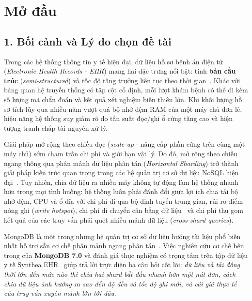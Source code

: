 \chapter*{Mở đầu}

\section*{1. Bối cảnh và Lý do chọn đề tài}

Trong các hệ thống thông tin y tế hiện đại, dữ liệu hồ sơ bệnh án điện tử (\textit{Electronic Health Records - EHR}) mang hai đặc trưng nổi bật: tính \textbf{bán cấu trúc} (\textit{semi-structured}) và tốc độ tăng trưởng liên tục theo thời gian~\cite{Freire2016}. Khác với bảng quan hệ truyền thống có tập cột cố định, mỗi lượt khám bệnh có thể đi kèm số lượng mã chẩn đoán và kết quả xét nghiệm biến thiên lớn. Khi khối lượng hồ sơ tích lũy qua nhiều năm vượt quá bộ nhớ đệm RAM của một máy chủ đơn lẻ, hiệu năng hệ thống suy giảm rõ do tần suất đọc/ghi ổ cứng tăng cao và hiện tượng tranh chấp tài nguyên xử lý.

Giải pháp mở rộng theo chiều dọc (\textit{scale-up} - nâng cấp phần cứng trên cùng một máy chủ) sớm chạm trần chi phí và giới hạn vật lý. Do đó, mở rộng theo chiều ngang thông qua phân mảnh dữ liệu phân tán (\textit{Horizontal Sharding}) trở thành giải pháp kiến trúc quan trọng trong các hệ quản trị cơ sở dữ liệu NoSQL hiện đại~\cite{Cattell2011,Kleppmann2017}. Tuy nhiên, chia dữ liệu ra nhiều máy không tự động làm hệ thống nhanh hơn trong mọi tình huống: hệ thống luôn phải đánh đổi giữa lợi ích chia tải bộ nhớ đệm, CPU và ổ đĩa với chi phí đi qua bộ định tuyến trung gian, rủi ro điểm nóng ghi (\textit{write hotspot}), chi phí di chuyển cân bằng dữ liệu~\cite{Liu2012} và chi phí thu gom kết quả của các truy vấn phải quét nhiều mảnh dữ liệu (\textit{cross-shard queries}).

MongoDB là một trong những hệ quản trị cơ sở dữ liệu hướng tài liệu phổ biến nhất hỗ trợ sẵn cơ chế phân mảnh ngang phân tán~\cite{MongoDBSharding}. Việc nghiên cứu cơ chế bên trong của \textbf{MongoDB 7.0} và đánh giá thực nghiệm có trọng tâm trên tập dữ liệu y tế Synthea EHR~\cite{Walonoski2018} giúp trả lời trực diện ba câu hỏi cốt lõi: \textit{dữ liệu và tải đồng thời lớn đến mức nào thì chia hai shard bắt đầu nhanh hơn một nút đơn, cách chia dữ liệu ảnh hưởng ra sao đến độ đều và tốc độ ghi mới, và cái giá thực tế của truy vấn xuyên mảnh lớn tới đâu}.

